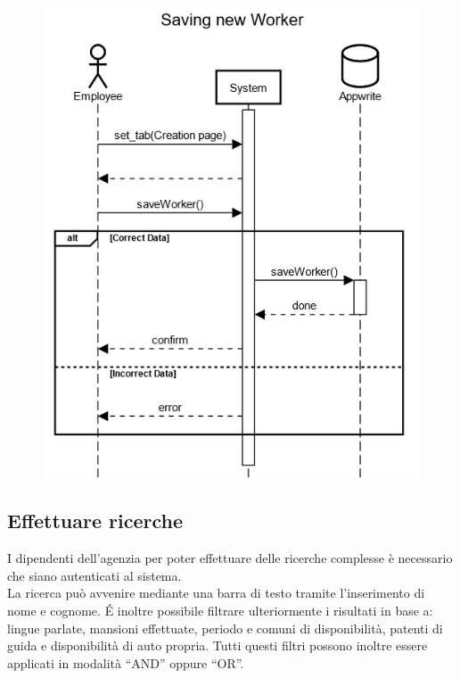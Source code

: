 \documentclass[a4paper, oneside, 12pt]{book}
\begin{document}
\begin{figure}[h!]
	\centering
	\includegraphics[width = 10 cm]{images/aggiunta}
	\label{fig:Inserimento lavoratore}
\end{figure}

\subsection{Effettuare ricerche}
I dipendenti dell’agenzia per poter effettuare delle ricerche complesse è necessario che siano autenticati al sistema. \\
La ricerca può avvenire mediante una barra di testo tramite l’inserimento di nome e cognome.
\'E inoltre possibile filtrare ulteriormente i risultati in base a: lingue parlate, mansioni effettuate, periodo e comuni di disponibilità,
patenti di guida e disponibilità di auto propria. Tutti questi filtri possono inoltre essere applicati in modalità “AND” oppure “OR”. \\

\end{document}
